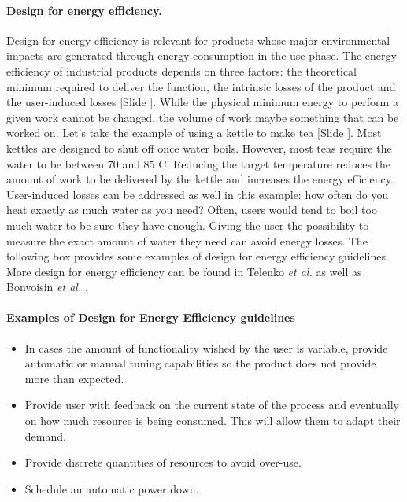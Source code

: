 \documentclass{article}
\newcounter{slide}
\begin{document}
\paragraph{Design for energy efficiency.}
\label{sec:DfEE}
Design for energy efficiency is relevant for products whose major environmental impacts are generated through energy consumption in the use phase. The energy efficiency of industrial products depends on three factors: the theoretical minimum required to deliver the function, the intrinsic losses of the product and the user-induced losses \cite{eliasUserefficientDesignReducing2011} {\color{blue}[Slide ]}. While the physical minimum energy to perform a given work cannot be changed, the volume of work maybe something that can be worked on. Let's take the example of using a kettle to make tea {\color{blue}[Slide ]}. Most kettles are designed to shut off once water boils. However, most teas require the water to be between 70 and 85 \textdegree C. Reducing the target temperature reduces the amount of work to be delivered by the kettle and increases the energy efficiency. User-induced losses can be addressed as well in this example: how often do you heat exactly as much water as you need? Often, users would tend to boil too much water to be sure they have enough. Giving the user the possibility to measure the exact amount of water they need can avoid energy losses. The following box provides some examples of design for energy efficiency guidelines. More design for energy efficiency can be found in Telenko \emph{et al.} \cite{telenkoCompilationDesignEnvironment2016a} as well as Bonvoisin \emph{et al.} \cite{bonvoisin2010design}.

\begin{framed} 
\footnotesize
\paragraph{Examples of Design for Energy Efficiency guidelines}
\begin{itemize}
  \item In cases the amount of functionality wished by the user is variable, provide automatic or manual tuning capabilities so the product does not provide more than expected.
	\item Provide user with feedback on the current state of the process and eventually on how much resource is being consumed. This will allow them to adapt their demand. 
	\item Provide discrete quantities of resources to avoid over-use. 
	\item Schedule an automatic power down.
\end{itemize}
\end{framed}
\end{document}

